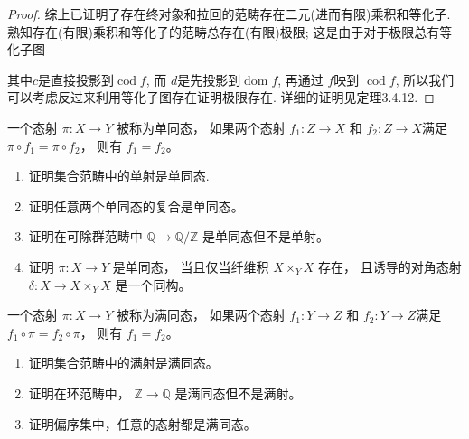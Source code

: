 \begin{proof}
    综上已证明了存在终对象和拉回的范畴存在二元(进而有限)乘积和等化子.
    熟知存在(有限)乘积和等化子的范畴总存在(有限)极限; 这是由于对于极限总有等化子图
    其中$c$是直接投影到$\operatorname{cod}f$, 而 $d$是先投影到$\operatorname{dom}f$, 再通过 $f$映到 $\operatorname{cod}f$,
    所以我们可以考虑反过来利用等化子图存在证明极限存在.
    详细的证明见\cite{Rie16}定理3.4.12.
\end{proof}

\begin{exercise}[单同态]
    一个态射 $\pi: X \rightarrow Y$ 被称为单同态，
    如果两个态射 $f_{1}: Z \rightarrow X$ 和 
    $f_{2}: Z \rightarrow X$满足 
    $\pi \circ f_{1}=\pi \circ f_{2}$，
    则有 $f_{1}=f_{2}$。
    \begin{enumerate}
        \item 证明集合范畴中的单射是单同态.
        \item 证明任意两个单同态的复合是单同态。
        \item 证明在可除群范畴中 
        $\mathbb{Q} \rightarrow \mathbb{Q} / \mathbb{Z}$ 
        是单同态但不是单射。
        \item 证明 $\pi: X \rightarrow Y$ 是单同态，
        当且仅当纤维积 $X \times_{Y} X$ 存在，
        且诱导的对角态射 $\delta: X \rightarrow X \times_{Y} X$ 
        是一个同构。
    \end{enumerate}
\end{exercise}

\begin{exercise}[满同态]
    一个态射 $\pi: X \rightarrow Y$ 被称为满同态，
    如果两个态射 $f_{1}: Y \rightarrow Z$ 和 
    $f_{2}: Y \rightarrow Z$满足 
    $f_{1} \circ \pi=f_{2} \circ \pi$，
    则有 $f_{1}=f_{2}$。
    \begin{enumerate}
        \item 证明集合范畴中的满射是满同态。
        \item 证明在环范畴中， $\mathbb{Z} \rightarrow \mathbb{Q}$ 是满同态但不是满射。
        \item 证明偏序集中，任意的态射都是满同态。
    \end{enumerate}
\end{exercise}

